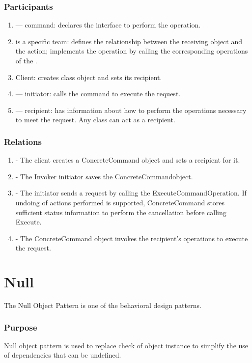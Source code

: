 \documentclass[12pt]{book}
\begin{document}
{{\subsubsection{Participants}
\begin{enumerate}
    \item {} — command: declares the interface to perform the operation.
    \item {} is a specific  team: defines the relationship between the  receiving object and the action; implements the  operation by calling the corresponding operations of the .
    \item Client: creates  class object and sets its recipient.
    \item {}— initiator: calls the command to execute the request.
    \item {} — recipient: has information about how to perform the operations necessary to meet the request. Any class can act as a recipient.
\end{enumerate}

\subsubsection{Relations}
\begin{enumerate}
    \item - The client creates a ConcreteCommand object and sets a recipient for it.
    \item - The Invoker initiator saves the  ConcreteCommandobject.
    \item - The initiator sends a request by calling the ExecuteCommandOperation. If undoing of actions performed is supported, ConcreteCommand  stores sufficient status information to perform the cancellation before calling  Execute.
    \item - The ConcreteCommand  object  invokes the recipient's operations to execute the request.
\end{enumerate}

\section{Null}
The Null Object Pattern is one of the behavioral design patterns.

\subsubsection{Purpose}
Null object pattern is used to replace check of  object instance to simplify the use of dependencies that can be undefined.

}}
\end{document}
